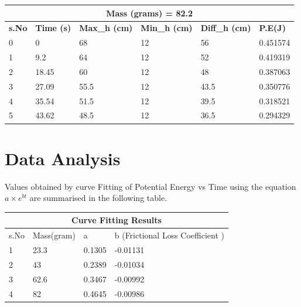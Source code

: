 \begin{center}
\begin{tabular}{|l|l|l|l|l|l|}
\hline
\multicolumn{6}{|c|}{\textbf{Mass (grams) = 82.2}} \\ \hline
\textbf{s.No} & \textbf{Time (s)} & \textbf{Max\_h (cm)} & \textbf{Min\_h (cm)} & \textbf{Diff\_h (cm)} & \textbf{P.E(J)} \\ \hline
0   & 0       & 68     & 12   & 56     & 0.451574  \\ \hline
1   & 9.2     & 64     & 12   & 52     & 0.419319  \\ \hline
2   & 18.45   & 60     & 12   & 48     & 0.387063  \\ \hline
3   & 27.09   & 55.5   & 12   & 43.5   & 0.350776  \\ \hline
4   & 35.54   & 51.5   & 12   & 39.5   & 0.318521  \\ \hline
5   & 43.62   & 48.5   & 12   & 36.5   & 0.294329  \\ \hline
\end{tabular}
\end{center}

\section{Data Analysis}

Values obtained by curve Fitting of Potential Energy vs Time using the equation $ a \times e^{bt}$ are summarised in the following table.
\begin{center}
\begin{tabular}{|l|l|l|l|}
\hline
\multicolumn{4}{|c|}{Curve   Fitting Results} \\ \hline
s.No   & Mass(gram)   & a        & b (Frictional Loss Coefficient  )       \\ \hline
1      & 23.3         & 0.1305   & -0.01131   \\ \hline
2      & 43           & 0.2389   & -0.01034   \\ \hline
3      & 62.6         & 0.3467   & -0.00992   \\ \hline
4      & 82           & 0.4645   & -0.00986   \\ \hline
\end{tabular}
\end{center}

